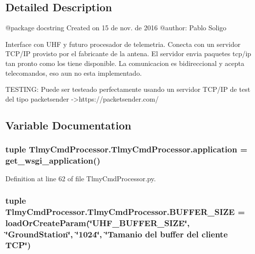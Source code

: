 \subsection{Detailed Description}
\begin{DoxyVerb}@package docstring
Created on 15 de nov. de 2016
@author: Pablo Soligo

Interface con UHF y futuro procesador de telemetria. Conecta con un servidor TCP/IP provisto por el fabricante de la 
antena. El servidor envia paquetes tcp/ip tan pronto como los tiene disponible. La comunicacion es bidireccional y acepta 
telecomandos, eso aun no esta implementado.

TESTING: Puede ser testeado perfectamente usando un servidor TCP/IP de test del tipo packetsender 
->https://packetsender.com/
\end{DoxyVerb}
 

\subsection{Variable Documentation}
\hypertarget{namespace_tlmy_cmd_processor_1_1_tlmy_cmd_processor_abc9fef542a08059c815604cf428eb8ea}{}
\subsubsection[{application}]{\setlength{\rightskip}{0pt plus 5cm}tuple Tlmy\+Cmd\+Processor.\+Tlmy\+Cmd\+Processor.\+application = get\+\_\+wsgi\+\_\+application()}\label{namespace_tlmy_cmd_processor_1_1_tlmy_cmd_processor_abc9fef542a08059c815604cf428eb8ea}


Definition at line 62 of file Tlmy\+Cmd\+Processor.\+py.

\hypertarget{namespace_tlmy_cmd_processor_1_1_tlmy_cmd_processor_ad6b870e079ada467cc4ac0b8f1f73039}{}
\subsubsection[{B\+U\+F\+F\+E\+R\+\_\+\+S\+I\+Z\+E}]{\setlength{\rightskip}{0pt plus 5cm}tuple Tlmy\+Cmd\+Processor.\+Tlmy\+Cmd\+Processor.\+B\+U\+F\+F\+E\+R\+\_\+\+S\+I\+Z\+E = load\+Or\+Create\+Param(\char`\"{}U\+H\+F\+\_\+\+B\+U\+F\+F\+E\+R\+\_\+\+S\+I\+Z\+E\char`\"{}, \char`\"{}Ground\+Station\char`\"{}, \char`\"{}1024\char`\"{}, \char`\"{}Tamanio del buffer del cliente T\+C\+P\char`\"{})}\label{namespace_tlmy_cmd_processor_1_1_tlmy_cmd_processor_ad6b870e079ada467cc4ac0b8f1f73039}


